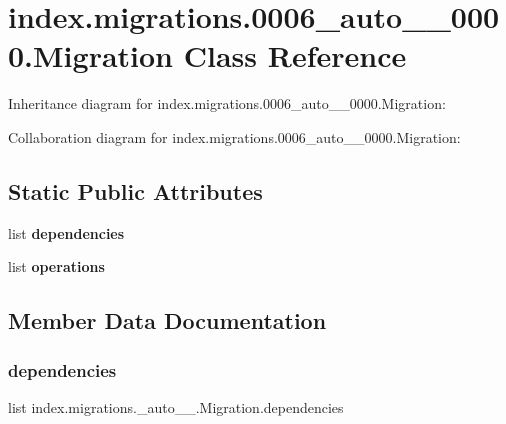 \hypertarget{classindex_1_1migrations_1_10006__auto__20171011__0000_1_1Migration}{}\section{index.\+migrations.0006\+\_\+auto\+\_\+\_\+0000.Migration Class Reference}
\label{classindex_1_1migrations_1_10006__auto__20171011__0000_1_1Migration}


Inheritance diagram for index.\+migrations.0006\+\_\+auto\+\_\+\_\+0000.Migration\+:


Collaboration diagram for index.\+migrations.0006\+\_\+auto\+\_\+\_\+0000.Migration\+:
\subsection*{Static Public Attributes}
\begin{DoxyCompactItemize}
\item 
list {\bfseries dependencies}
\item 
\mbox{\label{classindex_1_1migrations_1_10006__auto__20171011__0000_1_1Migration_ac51730d8496e8aebd5685ba1c028af1f}} 
list {\bfseries operations}
\end{DoxyCompactItemize}


\subsection{Member Data Documentation}
\mbox{\label{classindex_1_1migrations_1_10006__auto__20171011__0000_1_1Migration_afe08dc3b04b964efdd3ac093c12d2f10}} 
\subsubsection{\texorpdfstring{dependencies}{dependencies}}
{\footnotesize\ttfamily list index.\+migrations.\+\_\+auto\+\_\+\_.\+Migration.\+dependencies\hspace{0.3cm}{\ttfamily [static]}}

